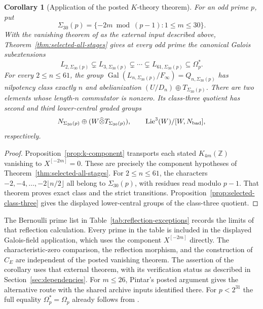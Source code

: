 \documentclass[11pt]{article}
\newtheorem{corollary}[theorem]{Corollary}
\theoremstyle{definition}\newtheorem{definition}[theorem]{Definition}
\begin{document}
\begin{corollary}[Application of the posted $K$-theory theorem]
\label{cor:k-canonical-detection}
For an odd prime $p$, put
\[
 \Sigma_{30}(p)=\{-2m\bmod(p-1):1\leq m\leq30\}.
\]
With the vanishing theorem of \cite[Theorem~1, p.~2]{MZ} as the
external input described above, Theorem~\ref{thm:selected-all-stages}
gives at every odd prime the canonical Galois subextensions
\[
 L_{2,\Sigma_{30}(p)}\subsetneq L_{3,\Sigma_{30}(p)}
 \subsetneq\cdots\subsetneq L_{61,\Sigma_{30}(p)}
 \subseteq\Omega_p^*.
\]
For every \(2\leq n\leq61\), the group
\(\operatorname{Gal}(L_{n,\Sigma_{30}(p)}/F_\infty)=Q_{n,\Sigma_{30}(p)}\)
has nilpotency class exactly \(n\) and abelianization
\((U/D_n)\oplus T_{\Sigma_{30}(p)}\).
There are two elements whose length-\(n\) commutator is nonzero.
Its class-three quotient has second and third lower-central
graded groups
\[
 N_{\Sigma_{30}(p)}\oplus(W\widehat\otimes T_{\Sigma_{30}(p)}),
 \qquad \operatorname{Lie}^3(W)/[W,N_{\rm bad}],
\]
respectively.
\end{corollary}
\begin{proof}
Proposition~\ref{prop:k-component} transports each stated
$K_{4m}(\mathbb Z)$ vanishing to $X^{[-2m]}=0$.
These are precisely the component hypotheses of
Theorem~\ref{thm:selected-all-stages}. For \(2\leq n\leq61\),
the characters \(-2,-4,\ldots,-2\lfloor n/2\rfloor\) all belong
to \(\Sigma_{30}(p)\), with residues read modulo \(p-1\).
That theorem proves exact class and the strict transitions.
Proposition~\ref{prop:selected-class-three} gives the displayed
lower-central groups of the class-three quotient.
\end{proof}
The Bernoulli prime list in Table~\ref{tab:reflection-exceptions}
records the limits of that reflection calculation. Every prime
in the table is included in the displayed Galois-field application,
which uses the component $X^{[-2m]}$ directly.
The characteristic-zero comparison, the reflection morphism,
and the construction of $C_E$ are independent of the posted
vanishing theorem. The assertion of the corollary uses that
external theorem, with its verification status as described in
Section~\ref{sec:dependencies}. For $m\leq26$, Pintar's posted
argument gives the alternative route with the shared archive
inputs identified there. For $p<2^{31}$ the full equality
$\Omega_p^*=\Omega_p$ already follows from \cite{HHO,Note}.
\end{document}
